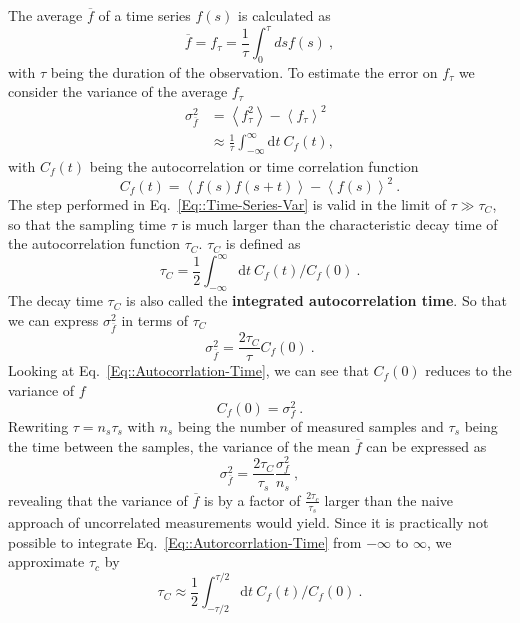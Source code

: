 	The average $\overline{f}$ of a time series $f(s)$ is calculated as
	\begin{equation}
		\overline{f} = f_\tau =	\frac{1}{\tau} \int_0^{\tau} ds f(s) ~,
	\end{equation}
	with $\tau$ being the duration of the observation. To estimate the error on $f_\tau$ we consider the variance of the average $f_\tau$ \cite{frenkel2023understanding, anderson2011statistical}
	\begin{equation} \label{Eq::Time-Series-Var}
		\begin{split}
			\sigma_{\overline{f}}^2 &=	\left \langle f_\tau^2 \right \rangle - \left \langle f_\tau \right \rangle^2 \\
			&\approx \frac{1}{\tau} \int_{-\infty}^{\infty} \text{d}t~C_f(t),
		\end{split}
	\end{equation}
	with $C_f(t)$ being the autocorrelation or time correlation function
	\begin{equation} \label{Eq::Autorcorrlation-Time}
		C_f(t) =	\left \langle f(s) f(s + t) \right \rangle - \left \langle f(s) \right \rangle^2~.
	\end{equation}
	The step performed in Eq.~\eqref{Eq::Time-Series-Var} is valid in the limit of $\tau \gg \tau_C$, so that the sampling time $\tau$ is much larger than the characteristic decay time of the autocorrelation function $\tau_C$. $\tau_C$ is defined as
	\begin{equation} \label{Eq::Autocorrelation-Time}
		\tau_C = \frac{1}{2}	\int_{-\infty}^{\infty} \text{d}t~C_f(t) /	C_f(0)~.
	\end{equation}
	The decay time $\tau_C$ is also called the \textbf{integrated autocorrelation time}. So that we can express $\sigma_{\overline{f}}^2$ in terms of $\tau_C$
	\begin{equation}
		\sigma_{\overline{f}}^2 =	\frac{2\tau_C}{\tau} C_f(0)~.
	\end{equation}
	Looking at Eq.~\eqref{Eq::Autocorrlation-Time}, we can see that $C_f(0)$ reduces to the variance of $f$
	\begin{equation}
		C_f(0) =	\sigma_f^2~.
	\end{equation}
	Rewriting $\tau =	n_s \tau_s$ with $n_s$ being the number of measured samples and $\tau_s$ being the time between the samples, the variance of the mean $\overline{f}$ can be expressed as
	\begin{equation}
		\sigma_{\overline{f}}^2 =	\frac{2 \tau_C}{\tau_s} \frac{\sigma_f^2}{n_s} ~,
	\end{equation}
	revealing that the variance of $\overline{f}$ is by a factor of $\frac{2 \tau_c}{\tau_s}$ larger than the naive approach of uncorrelated measurements would yield. Since it is practically not possible to integrate Eq.~\eqref{Eq::Autorcorrlation-Time} from $-\infty$ to $\infty$,   we approximate $\tau_c$ by
	\begin{equation}
		\tau_C \approx \frac{1}{2} \int_{-\tau/2}^{\tau/2} \text{d}t~C_f(t) /	C_f(0)~.
	\end{equation}
	
